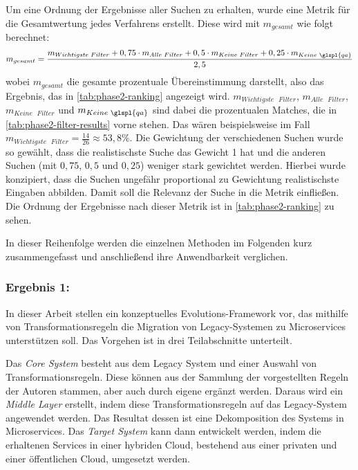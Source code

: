 Um eine Ordnung der Ergebnisse aller Suchen zu erhalten, wurde eine Metrik für die Gesamtwertung jedes Verfahrens erstellt.
Diese wird mit $m_{gesamt}$ wie folgt berechnet:
\[
m_{gesamt} = \frac{m_{Wichtigste \text{ } Filter} + 0,75 \cdot  m_{Alle \text{ } Filter} +  0,5 \cdot m_{Keine \text{ } Filter} + 0,25 \cdot m_{Keine \text{ } \glspl{qa}}}{2,5}
\]
wobei $m_{gesamt}$ die gesamte prozentuale Übereinstimmung darstellt, also das Ergebnis, das in \cref{tab:phase2-ranking} angezeigt wird.
$m_{Wichtigste \text{ } Filter}$, $m_{Alle \text{ } Filter}$, $m_{Keine \text{ } Filter}$ und $m_{Keine \text{ } \glspl{qa}}$ sind dabei die prozentualen Matches, die in \cref{tab:phase2-filter-results} vorne stehen.
Das wären beispielsweise im Fall  $m_{Wichtigste \text{ } Filter} = \frac{14}{26} \approx 53,8\%$.
Die Gewichtung der verschiedenen Suchen wurde so gewählt, dass die realistischste Suche das Gewicht 1 hat und die anderen Suchen (mit $0,75$, $0,5$ und $0,25$) weniger stark gewichtet werden.
Hierbei wurde konzipiert, dass die Suchen ungefähr proportional zu Gewichtung realistischste Eingaben abbilden.
Damit soll die Relevanz der Suche in die Metrik einfließen.
Die Ordnung der Ergebnisse nach dieser Metrik ist in \cref{tab:phase2-ranking} zu sehen.


In dieser Reihenfolge werden die einzelnen Methoden im Folgenden kurz zusammengefasst und anschließend ihre Anwendbarkeit verglichen.

\subsubsection{Ergebnis 1:   \cite{arh-result-no-filter-1}}

In dieser Arbeit stellen \citeauthor{arh-result-no-filter-1} ein konzeptuelles Evolutions-Framework vor, das mithilfe von Trans\-for\-ma\-tions\-re\-geln die Migration von Legacy-Systemen zu Microservices unterstützen soll.
Das Vorgehen ist in drei Teilabschnitte unterteilt. 

Das \emph{Core System} besteht aus dem Legacy System und einer Auswahl von Transformationsregeln.
Diese können aus der Sammlung der vorgestellten Regeln der Autoren stammen, aber auch durch eigene ergänzt werden.
Daraus wird ein \emph{Middle Layer} erstellt, indem diese Transformationsregeln auf das Legacy-System angewendet werden.
Das Resultat dessen ist eine Dekomposition des Systems in Microservices.
Das \emph{Target System} kann dann entwickelt werden, indem die erhaltenen Services in einer hybriden Cloud, bestehend aus einer privaten und einer öffentlichen Cloud, umgesetzt werden.


